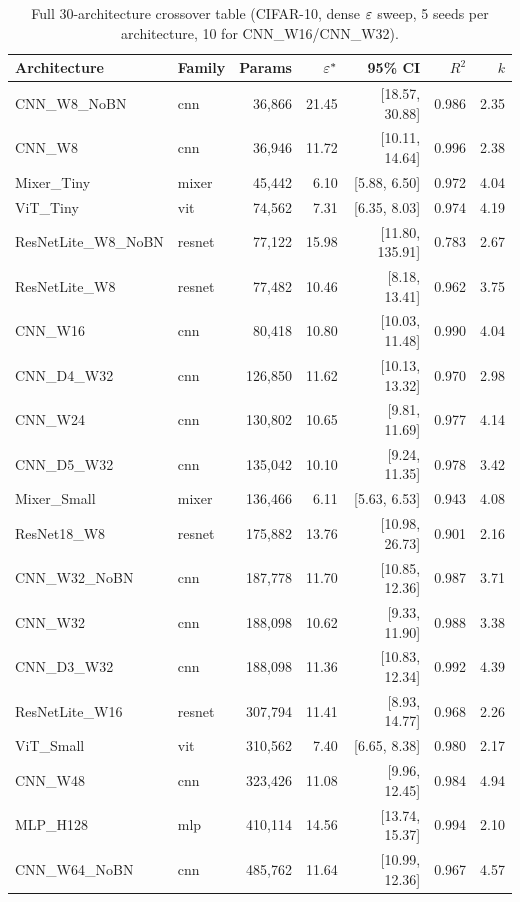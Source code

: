 \begin{table}[h]
\centering
\caption{Full 30-architecture crossover table (CIFAR-10, dense $\varepsilon$ sweep, 5 seeds per architecture, 10 for CNN\_W16/CNN\_W32).}
\label{tab:fullcrossover}
\tiny
\begin{tabular}{llrrrrr}
\toprule
Architecture & Family & Params & $\varepsilon^{*}$ & 95\% CI & $R^2$ & $k$ \\
\midrule
CNN\_W8\_NoBN & cnn & 36,866 & 21.45 & [18.57, 30.88] & 0.986 & 2.35 \\
CNN\_W8 & cnn & 36,946 & 11.72 & [10.11, 14.64] & 0.996 & 2.38 \\
Mixer\_Tiny & mixer & 45,442 & 6.10 & [5.88, 6.50] & 0.972 & 4.04 \\
ViT\_Tiny & vit & 74,562 & 7.31 & [6.35, 8.03] & 0.974 & 4.19 \\
ResNetLite\_W8\_NoBN & resnet & 77,122 & 15.98 & [11.80, 135.91] & 0.783 & 2.67 \\
ResNetLite\_W8 & resnet & 77,482 & 10.46 & [8.18, 13.41] & 0.962 & 3.75 \\
CNN\_W16 & cnn & 80,418 & 10.80 & [10.03, 11.48] & 0.990 & 4.04 \\
CNN\_D4\_W32 & cnn & 126,850 & 11.62 & [10.13, 13.32] & 0.970 & 2.98 \\
CNN\_W24 & cnn & 130,802 & 10.65 & [9.81, 11.69] & 0.977 & 4.14 \\
CNN\_D5\_W32 & cnn & 135,042 & 10.10 & [9.24, 11.35] & 0.978 & 3.42 \\
Mixer\_Small & mixer & 136,466 & 6.11 & [5.63, 6.53] & 0.943 & 4.08 \\
ResNet18\_W8 & resnet & 175,882 & 13.76 & [10.98, 26.73] & 0.901 & 2.16 \\
CNN\_W32\_NoBN & cnn & 187,778 & 11.70 & [10.85, 12.36] & 0.987 & 3.71 \\
CNN\_W32 & cnn & 188,098 & 10.62 & [9.33, 11.90] & 0.988 & 3.38 \\
CNN\_D3\_W32 & cnn & 188,098 & 11.36 & [10.83, 12.34] & 0.992 & 4.39 \\
ResNetLite\_W16 & resnet & 307,794 & 11.41 & [8.93, 14.77] & 0.968 & 2.26 \\
ViT\_Small & vit & 310,562 & 7.40 & [6.65, 8.38] & 0.980 & 2.17 \\
CNN\_W48 & cnn & 323,426 & 11.08 & [9.96, 12.45] & 0.984 & 4.94 \\
MLP\_H128 & mlp & 410,114 & 14.56 & [13.74, 15.37] & 0.994 & 2.10 \\
CNN\_W64\_NoBN & cnn & 485,762 & 11.64 & [10.99, 12.36] & 0.967 & 4.57 \\

\end{tabular}
\end{table}

